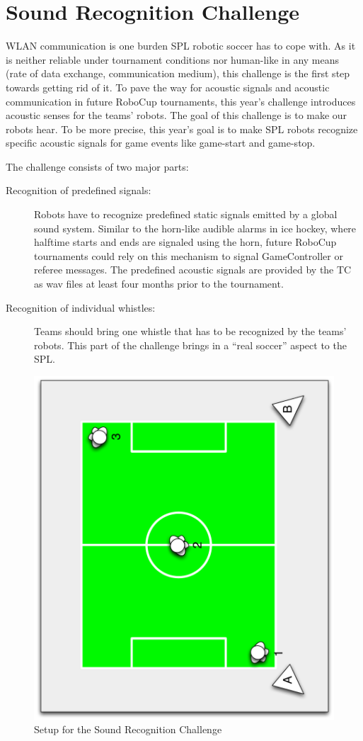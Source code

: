 \documentclass[12pt]{article}
\begin{document}
\newpage






\section{Sound Recognition Challenge}

WLAN communication is one burden SPL robotic soccer has to cope with. As it is neither reliable under tournament conditions nor human-like in any means (rate of data exchange, communication medium), this challenge is the first step towards getting rid of it. To pave the way for acoustic signals and acoustic communication in future RoboCup tournaments, this year's challenge introduces acoustic senses for the teams' robots. The goal of this challenge is to make our robots hear. To be more precise, this year's goal is to make SPL robots recognize specific acoustic signals for game events like game-start and game-stop.

The challenge consists of two major parts:
\begin{description}
	\item[Recognition of predefined signals:] Robots have to recognize predefined static signals emitted by a global sound system. Similar to the horn-like audible alarms in ice hockey, where halftime starts and ends are signaled using the horn, future RoboCup tournaments could rely on this mechanism to signal GameController or referee messages. The predefined acoustic signals are provided by the TC as wav files at least four months prior to the tournament.
	
	\item[Recognition of individual whistles:] Teams should bring one whistle that has to be recognized by the teams' robots. This part of the challenge brings in a ``real soccer'' aspect to the SPL.
	
\end{description}

\begin{figure}[th!]
\centerline{\includegraphics[width=0.6\columnwidth,angle=270]{figures/acuesthesia}}
\caption{Setup for the Sound Recognition Challenge}
\label{fig:recognition_challenge}
\end{figure}
\end{document}
